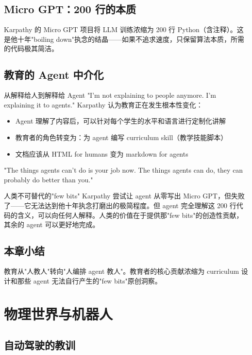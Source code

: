 \documentclass[a4paper]{article}
\begin{document}
\subsection{Micro GPT：200 行的本质}

Karpathy 的 Micro GPT 项目将 LLM 训练浓缩为 200 行 Python（含注释）。这是他十年"boiling down"执念的结晶——如果不追求速度，只保留算法本质，所需的代码极其简洁。

\subsection{教育的 Agent 中介化}

\begin{importantbox}{从解释给人到解释给 Agent}
"I'm not explaining to people anymore. I'm explaining it to agents." Karpathy 认为教育正在发生根本性变化：
\begin{itemize}
    \item Agent 理解了内容后，可以针对每个学生的水平和语言进行定制化讲解
    \item 教育者的角色转变为：为 agent 编写 curriculum skill（教学技能脚本）
    \item 文档应该从 HTML for humans 变为 markdown for agents
\end{itemize}
"The things agents can't do is your job now. The things agents can do, they can probably do better than you."
\end{importantbox}

\begin{knowledgebox}{人类不可替代的"few bits"}
Karpathy 尝试让 agent 从零写出 Micro GPT，但失败了——它无法达到他十年执念打磨出的极简程度。但 agent 完全理解这 200 行代码的含义，可以向任何人解释。人类的价值在于提供那"few bits"的创造性贡献，其余的 agent 可以更好地完成。
\end{knowledgebox}

\subsection{本章小结}

教育从"人教人"转向"人编排 agent 教人"。教育者的核心贡献浓缩为 curriculum 设计和那些 agent 无法自行产生的"few bits"原创洞察。


\section{物理世界与机器人}

\subsection{自动驾驶的教训}
\end{document}
